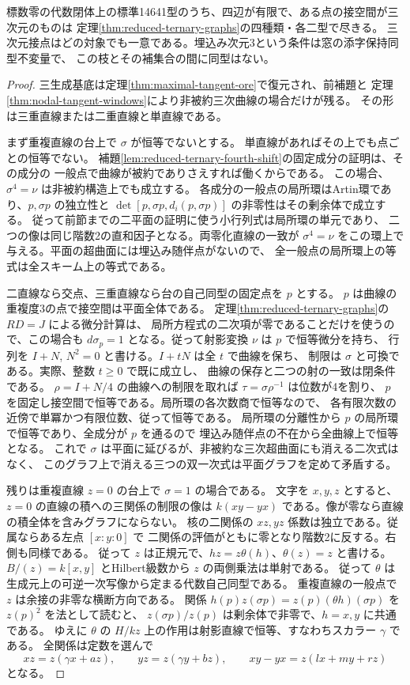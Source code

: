 \begin{theorem}\label{thm:maximal-tangent-complete}
標数零の代数閉体上の標準14641型のうち、四辺が有限で、ある点の接空間が三次元のものは
定理\ref{thm:reduced-ternary-graphs}の四種類・各二型で尽きる。
三次元接点はどの対象でも一意である。埋込み次元3という条件は窓の添字保持同型不変量で、
この枝とその補集合の間に同型はない。
\end{theorem}
\begin{proof}
三生成基底は定理\ref{thm:maximal-tangent-ore}で復元され、前補題と
定理\ref{thm:nodal-tangent-windows}により非被約三次曲線の場合だけが残る。
その形は三重直線または二重直線と単直線である。

まず重複直線の台上で $\sigma$ が恒等でないとする。
単直線があればその上でも点ごとの恒等でない。
補題\ref{lem:reduced-ternary-fourth-shift}の固定成分の証明は、その成分の
一般点で曲線が被約でありさえすれば働くからである。
この場合、$\sigma^4=\nu$ は非被約構造上でも成立する。
各成分の一般点の局所環はArtin環であり、$p,\sigma p$ の独立性と
$\det[p,\sigma p,d_i(p,\sigma p)]$ の非零性はその剰余体で成立する。
従って前節までの二平面の証明に使う小行列式は局所環の単元であり、
二つの像は同じ階数2の直和因子となる。両零化直線の一致が
$\sigma^4=\nu$ をこの環上で与える。平面の超曲面には埋込み随伴点がないので、
全一般点の局所環上の等式は全スキーム上の等式である。

二直線なら交点、三重直線なら台の自己同型の固定点を $p$ とする。
$p$ は曲線の重複度3の点で接空間は平面全体である。
定理\ref{thm:reduced-ternary-graphs}の $RD=J$ による微分計算は、
局所方程式の二次項が零であることだけを使うので、この場合も
$d\sigma_p=1$ となる。従って射影変換 $\nu$ は $p$ で恒等微分を持ち、
行列を $I+N$, $N^2=0$ と書ける。$I+tN$ は全 $t$ で曲線を保ち、
制限は $\sigma$ と可換である。実際、整数 $t\ge0$ で既に成立し、
曲線の保存と二つの射の一致は閉条件である。
$\rho=I+N/4$ の曲線への制限を取れば $\tau=\sigma\rho^{-1}$ は位数が4を割り、
$p$ を固定し接空間で恒等である。局所環の各次数商で恒等なので、
各有限次数の近傍で単冪かつ有限位数、従って恒等である。
局所環の分離性から $p$ の局所環で恒等であり、全成分が $p$ を通るので
埋込み随伴点の不在から全曲線上で恒等となる。
これで $\sigma$ は平面に延びるが、非被約な三次超曲面にも消える二次式はなく、
このグラフ上で消える三つの双一次式は平面グラフを定めて矛盾する。

残りは重複直線 $z=0$ の台上で $\sigma=1$ の場合である。
文字を $x,y,z$ とすると、$z=0$ の直線の積への三関係の制限の像は
$k(xy-yx)$ である。像が零なら直線の積全体を含みグラフにならない。
核の二関係の $xz,yz$ 係数は独立である。従属ならある左点 $[x:y:0]$ で
二関係の評価がともに零となり階数2に反する。右側も同様である。
従って $z$ は正規元で、$hz=z\theta(h)$、$\theta(z)=z$ と書ける。
$B/(z)=k[x,y]$ とHilbert級数から $z$ の両側乗法は単射である。
従って $\theta$ は生成元上の可逆一次写像から定まる代数自己同型である。
重複直線の一般点で $z$ は余接の非零な横断方向である。
関係 $h(p)z(\sigma p)=z(p)(\theta h)(\sigma p)$ を $z(p)^2$ を法として読むと、
$z(\sigma p)/z(p)$ は剰余体で非零で、$h=x,y$ に共通である。
ゆえに $\theta$ の $H/kz$ 上の作用は射影直線で恒等、すなわちスカラー $\gamma$ である。
全関係は定数を選んで
\[
 xz=z(\gamma x+a z),\qquad yz=z(\gamma y+b z),\qquad
 xy-yx=z(lx+my+rz)
\]
となる。


\end{proof}
